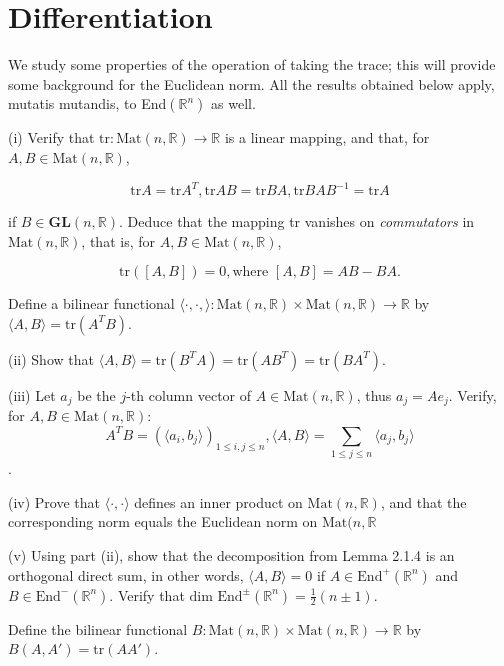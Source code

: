 \chapter{Differentiation}

\begin{exercise}{1}
    We study some properties of the operation of taking the trace; this will provide some background for the Euclidean norm. All the results obtained below apply, mutatis mutandis, to End$(\mathbb{R}^n)$ as well.

    (i) Verify that $\text{tr}: \text{Mat}(n, \mathbb{R}) \rightarrow \mathbb{R}$ is a linear mapping, and that, for $A, B \in \text{Mat}(n, \mathbb{R})$,

    $$\text{tr} A = \text{tr} A^T, \text{tr} AB = \text{tr} BA, \text{tr} BAB^{-1} = \text{tr} A$$

    if $B \in \textbf{GL}(n, \mathbb{R})$. Deduce that the mapping tr vanishes on \textit{commutators} in $\text{Mat}(n, \mathbb{R})$, that is, for $A, B \in \text{Mat}(n, \mathbb{R})$,

    $$\text{tr}([A, B]) = 0, \text{where    } [A, B] = AB-BA.$$

    Define a bilinear functional $\langle \cdot, \cdot, \rangle : \text{Mat}(n, \mathbb{R}) \times \text{Mat}(n, \mathbb{R}) \rightarrow \mathbb{R}$ by $\langle A, B \rangle = \text{tr}(A^TB)$.

    (ii) Show that $\langle A, B \rangle = \text{tr}(B^TA) = \text{tr}(AB^T) = \text{tr}(BA^T)$.

    (iii) Let $a_j$ be the $j$-th column vector of $A \in \text{Mat}(n, \mathbb{R})$, thus $a_j = Ae_j$. Verify, for $A, B \in \text{Mat}(n, \mathbb{R})$:
    $$A^TB = (\langle a_i, b_j \rangle)_{1 \leq i, j \leq n}, \langle A, B \rangle = \sum_{1 \leq j \leq n} \langle a_j, b_j \rangle$$.

    (iv) Prove that $\langle \cdot, \cdot \rangle$ defines an inner product on $\text{Mat}(n, \mathbb{R})$, and that the corresponding norm equals the Euclidean norm on $\text{Mat}(n, \mathbb{R}$

    (v) Using part (ii), show that the decomposition from Lemma 2.1.4 is an orthogonal direct sum, in other words, $\langle A, B \rangle = 0$ if $A \in \text{End}^+(\mathbb{R}^n)$ and $B \in \text{End}^-(\mathbb{R}^n)$. Verify that $\text{dim End}^{\pm}(\mathbb{R}^n) = \frac{1}{2}(n\pm1)$.

    Define the bilinear functional $B : \text{Mat}(n, \mathbb{R}) \times \text{Mat}(n, \mathbb{R}) \rightarrow \mathbb{R}$ by $B(A, A') = \text{tr}(AA')$.
    

\end{exercise}
